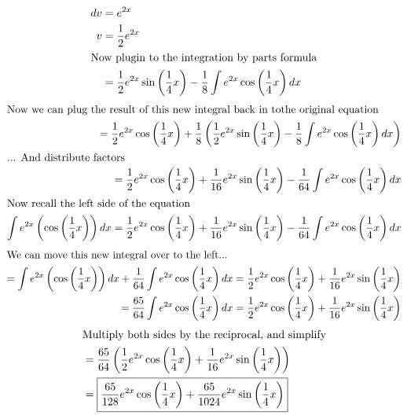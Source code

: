 \documentclass[letterpaper, 12pt]{article}
\begin{document}
\begin{align}
    dv&=e^{2x}                                                                                                                                                                                                                    \\
    v&=\frac{1}{2}e^{2x}                                                                                                                                                                                                          \\
    \intertext{Now plugin to the integration by parts formula}
    &=\frac{1}{2}e^{2x}\sin\left(\frac{1}{4}x\right)-\frac{1}{8}\int e^{2x}\cos\left(\frac{1}{4}x\right)dx                                                                                                                 
\end{align}
\begin{align}
    \intertext{Now we can plug the result of this new integral back in tothe original equation}
    =\frac{1}{2}e^{2x}\cos\left(\frac{1}{4}x\right)+\frac{1}{8}\left(\frac{1}{2}e^{2x}\sin\left(\frac{1}{4}x\right)-\frac{1}{8}\int e^{2x}\cos\left(\frac{1}{4}x\right)dx\right)                                          \\
    \intertext{... And distribute factors}
    =\frac{1}{2}e^{2x}\cos\left(\frac{1}{4}x\right)+\frac{1}{16}e^{2x}\sin\left(\frac{1}{4}x\right)-\frac{1}{64}\int e^{2x}\cos\left(\frac{1}{4}x\right)dx                                                                \\
    \intertext{Now recall the left side of the equation}
    \int e^{2x}\left(\cos\left(\frac{1}{4}x\right)\right)dx=\frac{1}{2}e^{2x}\cos\left(\frac{1}{4}x\right)+\frac{1}{16}e^{2x}\sin\left(\frac{1}{4}x\right)-\frac{1}{64}\int e^{2x}\cos\left(\frac{1}{4}x\right)dx
\end{align}
\begin{align}
    \intertext{We can move this new integral over to the left...}
    =\int e^{2x}\left(\cos\left(\frac{1}{4}x\right)\right)dx+\frac{1}{64}\int e^{2x}\cos\left(\frac{1}{4}x\right)dx&=\frac{1}{2}e^{2x}\cos\left(\frac{1}{4}x\right)+\frac{1}{16}e^{2x}\sin\left(\frac{1}{4}x\right) \\
    =\frac{65}{64}\int e^{2x}\cos\left(\frac{1}{4}x\right)dx&=\frac{1}{2}e^{2x}\cos\left(\frac{1}{4}x\right)+\frac{1}{16}e^{2x}\sin\left(\frac{1}{4}x\right)                                                                
\end{align}
\begin{align}
    \intertext{Multiply both sides by the reciprocal, and simplify}
    &=\frac{65}{64}\left(\frac{1}{2}e^{2x}\cos\left(\frac{1}{4}x\right)+\frac{1}{16}e^{2x}\sin\left(\frac{1}{4}x\right)\right)                                                                                                    \\
    &=\boxed{\frac{65}{128}e^{2x}\cos\left(\frac{1}{4}x\right)+\frac{65}{1024}e^{2x}\sin\left(\frac{1}{4}x\right)                                                                                                                        }
\end{align}
\end{document}
